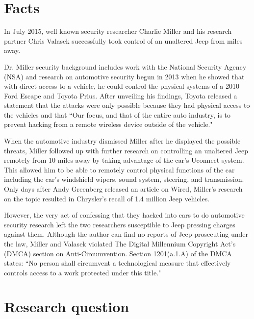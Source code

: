 \documentclass[12pt]{article}
\begin{document}
\tableofcontents
\newpage
\begin{multicols}{2}

\section{Facts}

In July 2015, well known security researcher Charlie Miller and his research partner Chris Valasek successfully took control of an unaltered Jeep from miles away. \cite{wired}

Dr. Miller security background includes work with the National Security Agency (NSA) and  research on automotive security begun in 2013 when he showed that with direct access to a vehicle, he could control the physical systems of a 2010 Ford Escape and Toyota Prius. \cite{officialPaper} After unveiling his findings, Toyota released a statement that the attacks were only possible because they had physical access to the vehicles and that ``Our focus, and that of the entire auto industry, is to prevent hacking from a remote wireless device outside of the vehicle." \cite{originalHack}

When the automotive industry dismissed Miller after he displayed the possible threats, Miller followed up with further research on controlling an unaltered Jeep remotely from 10 miles away by taking advantage of the car's Uconnect system. \cite{officialPaper} This allowed him to be able to remotely control physical functions of the car including the car's windshield wipers, sound system, steering, and transmission. \cite{wired}  Only days after Andy Greenberg released an article on Wired, Miller's research on the topic resulted in Chrysler's recall of 1.4 million Jeep vehicles.\cite{recall} 

However, the very act of confessing that they hacked into cars to do automotive security research left the two researchers susceptible to Jeep pressing charges against them. \cite{brokeDMCA} Although the author can find no reports of Jeep prosecuting under the law, Miller and Valasek violated The Digital Millennium Copyright Act's (DMCA) section on Anti-Circumvention. Section 1201(a.1.A) of the DMCA states: ``No person shall circumvent a technological measure that effectively controls access to a work protected under this title."\cite{DMCA}


\section{Research question} 


\end{multicols}
\end{document}
